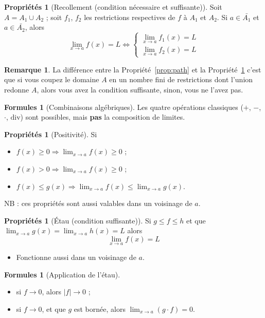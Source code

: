 \documentclass[11pt,a4paper]{article}
\theoremstyle{definition}
\newtheorem{myprop}[mydef]{Propriétés}
\newtheorem{myrem}[mydef]{Remarque}
\newtheorem{myform}[mydef]{Formules}
\renewcommand{\div}{\mathrm{div}}
\newcommand*\InsertTheoremBreak{%
	\begingroup %
		\setlength\itemsep{0pt}%
		\setlength\parsep{0pt}%
		\item[\vbox{\null}]%
	\endgroup%
}%
\begin{document}
\begin{myprop}[Recollement (condition nécessaire et suffisante)]
	\label{prop:rec}
	Soit $A = A_1 \cup A_2$ ; soit $f_1$, $f_2$ les restrictions respectives de $f$ à $A_1$ et $A_2$. Si $a \in \bar{A_1}$ et $a \in \bar{A_2}$, alors
	\[ \lim_{x \to a}f(x) = L \Leftrightarrow \left\{
	\begin{array}{l}
		\lim_{x \to a} f_1(x) = L \\
		\lim_{x \to a}f_2(x) = L
	\end{array} \right. \]
\end{myprop}

\begin{myrem}
	La différence entre la Propriété~\ref{prop:path} et la Propriété~\ref{prop:rec} c'est que
	si vous coupez le domaine $A$ en un nombre fini de restrictions dont l'union redonne $A$,
	alors vous avez la condition suffisante, sinon, vous ne l'avez pas.
\end{myrem}

\begin{myform}[Combinaisons algébriques]
	Les quatre opérations classiques ($+$, $-$, $\cdot$, $\div$) sont possibles, mais \textbf{pas} la composition de limites.
\end{myform}

\begin{myprop}[Positivité] Si
	\begin{itemize}
		\item $f(x) \geq 0 \Rightarrow \lim_{x \to a} f(x) \geq 0$ ;
		\item $f(x) > 0 \Rightarrow \lim_{x \to a} f(x) \geq 0$ ;
		\item $f(x) \leq g(x) \Rightarrow \lim_{x \to a} f(x) \leq \lim_{x \to a} g(x)$.
	\end{itemize}
	NB : ces propriétés sont aussi valables dans un voisinage de $a$.
\end{myprop}

\begin{myprop}[Étau (condition suffisante)]
	Si $g \leq f \leq h$ et que $\lim_{x \to a} g(x) = \lim_{x \to a} h(x) = L$ alors
	\[ \lim_{x \to a} f(x) = L \]
	\begin{itemize}
		\item Fonctionne aussi dans un voisinage de $a$.
	\end{itemize}
\end{myprop}

\begin{myform}[Application de l'étau]\InsertTheoremBreak
	\begin{itemize}
		\item si $f \rightarrow 0$, alors $|f| \rightarrow 0$ ;
		\item si $f \to 0$, et que $g$ est bornée, alors $\lim_{x \to a} (g \cdot f) = 0$.
	\end{itemize}
\end{myform}
\end{document}

